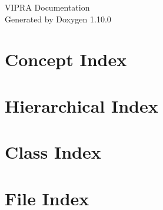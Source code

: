 \documentclass[twoside]{book}
\newcommand{\+}{\discretionary{\mbox{\scriptsize$\hookleftarrow$}}{}{}}
\newcommand{\clearemptydoublepage}{%
    \newpage{\pagestyle{empty}\cleardoublepage}%
  }
\begin{document}
  \raggedbottom
    \hypersetup{pageanchor=false,
                bookmarksnumbered=true,
                pdfencoding=unicode
               }
  \begin{titlepage}
  \vspace*{7cm}
  \begin{center}%
  {\Large VIPRA Documentation}\\
  \vspace*{1cm}
  {\large Generated by Doxygen 1.10.0}\\
  \end{center}
  \end{titlepage}
  \clearemptydoublepage
  \tableofcontents
  \clearemptydoublepage
  \hypersetup{pageanchor=true}


\chapter{Concept Index}

\chapter{Hierarchical Index}

\chapter{Class Index}

\chapter{File Index}

\end{document}
